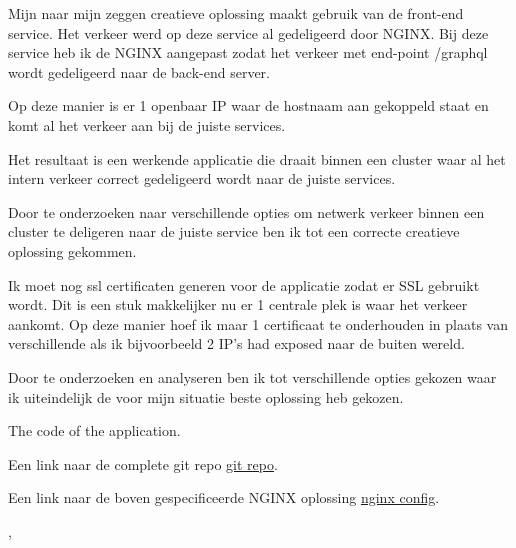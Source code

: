 {{{			Mijn naar mijn zeggen creatieve oplossing maakt gebruik van de front-end service.
			Het verkeer werd op deze service al gedeligeerd door NGINX.
			Bij deze service heb ik de NGINX aangepast zodat het verkeer met end-point /graphql wordt gedeligeerd naar de back-end server.

			Op deze manier is er 1 openbaar IP waar de hostnaam aan gekoppeld staat en komt al het verkeer aan bij de juiste services.

		}
		{%
			Het resultaat is een werkende applicatie die draait binnen een cluster waar al het intern verkeer correct gedeligeerd wordt naar de juiste services.
		}
		{%
			Door te onderzoeken naar verschillende opties om netwerk verkeer binnen een cluster te deligeren naar de juiste service ben ik tot een correcte creatieve oplossing gekommen.

			Ik moet nog ssl certificaten generen voor de applicatie zodat er SSL gebruikt wordt.
			Dit is een stuk makkelijker nu er 1 centrale plek is waar het verkeer aankomt.
			Op deze manier hoef ik maar 1 certificaat te onderhouden in plaats van verschillende als ik bijvoorbeeld 2 IP's had exposed naar de buiten wereld.

			Door te onderzoeken en analyseren ben ik tot verschillende opties gekozen waar ik uiteindelijk de voor mijn situatie beste oplossing heb gekozen.

		}
		{
			The code of the application.
		}
	}
	{%
		Een link naar de complete git repo \href{https://github.com/aladante/product_inventaris}{git repo}.

		Een link naar de boven gespecificeerde NGINX oplossing \href{https://github.com/aladante/product_inventaris/blob/main/front-end/nginx/nginx.conf}{nginx config}.
	},
}
